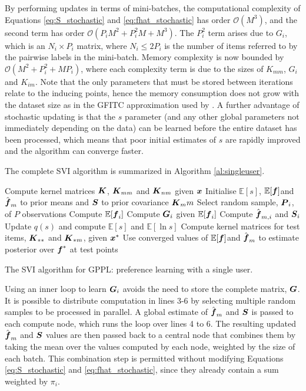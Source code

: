 By performing updates in terms of mini-batches, 
the computational complexity of Equations \ref{eq:S_stochastic} and
\ref{eq:fhat_stochastic} has order $\mathcal{O}(M^3)$, and the second term has order $\mathcal{O}(P_i M^2 + P_i^2 M + M^3)$. The $P_i^2$ term arises due to $G_i$, which is an $N_i \times P_i$ matrix, where $N_i \leq 2P_i$ is the number of 
items referred to by the pairwise labels in the mini-batch.
Memory complexity is now bounded by $\mathcal{O}(M^2 + P_i^2 + M P_i)$, where each complexity term is due
to the sizes of $K_{mm}$, $G_i$ and $K_{im}$.
Note that the only parameters that must be stored between iterations relate to the 
inducing points, hence the memory consumption does not grow with the dataset size 
as in the GFITC approximation used by \citet{houlsby2012collaborative}.
A further advantage of stochastic updating is that the $s$ parameter (and any other global
parameters not immediately depending on the data) can be learned
before the entire dataset has been processed,
which means that poor initial estimates of $s$ are rapidly improved
and the algorithm can converge faster.

The complete SVI algorithm is summarized in Algorithm \ref{al:singleuser}.
\begin{algorithm}[h]
 \nl Compute kernel matrices $\boldsymbol K$, $\boldsymbol K_{mm}$ and $\boldsymbol K_{nm}$ given $\boldsymbol x$
 \nl Initialise $\mathbb{E}[s]$, $\mathbb{E}[\boldsymbol f]$and $\hat{\boldsymbol f}_m$ to prior means
 and $\boldsymbol S$ to prior covariance $\boldsymbol K_mm$\;
 {
 \nl Select random sample, $\boldsymbol P_i$, of $P$ observations
  {
  \nl Compute $\mathbb{E}[\boldsymbol f_i]$ \;
  \nl Compute $\boldsymbol G_i$ given $\mathbb{E}[\boldsymbol f_i]$ \;
  \nl Compute $\hat{\boldsymbol f}_{m,i}$ and $\boldsymbol S_{i}$ \;
  }
 \nl Update $q(s)$ and compute $\mathbb{E}[s]$ and $\mathbb{E}[\ln s]$\;
 }
\nl Compute kernel matrices for test items, $\boldsymbol K_{**}$ and $\boldsymbol K_{*m}$, given $\boldsymbol x^*$ \;
\nl Use converged values of $\mathbb{E}[\boldsymbol f]$and $\hat{\boldsymbol f}_m$ to estimate
posterior over $\boldsymbol f^*$ at test points \;
\vspace{0.5cm}
\caption{The SVI algorithm for GPPL: preference learning with a single user.}
\label{al:singleuser}
\end{algorithm}
Using an inner loop to learn $\boldsymbol G_i$ avoids the need to store the complete matrix, 
$\boldsymbol G$.
It is possible to distribute computation in lines 3-6 by selecting multiple random samples
to be processed in parallel. A global estimate of $\hat{\boldsymbol f}_m$ and $\boldsymbol S$
is passed to each compute node, which runs the loop over lines 4 to 6.
The resulting updated $\hat{\boldsymbol f}_m$ and $\boldsymbol S$ values are then passed back to a 
central node that combines them by taking the mean over the values computed by 
each node, weighted by the size of each batch. 
This combination step is permitted without modifying Equations \ref{eq:S_stochastic} and \ref{eq:fhat_stochastic}, since they already contain a sum weighted by $\pi_i$.


